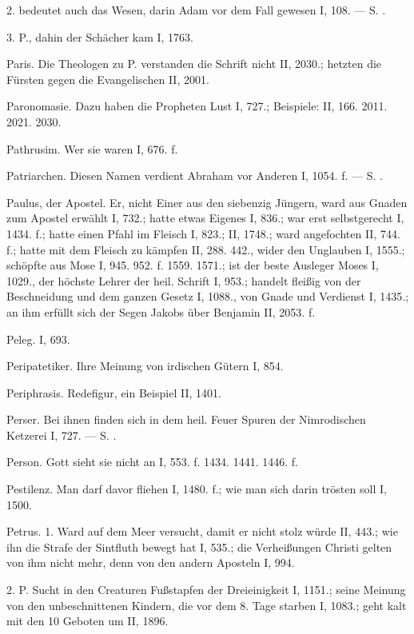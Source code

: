 2.  bedeutet auch das Wesen, darin Adam vor dem Fall gewesen I, 108. — S. .

3.  P., dahin der Schächer kam I, 1763.

Paris. Die Theologen zu P. verstanden die Schrift nicht II, 2030.; hetzten die Fürsten gegen die Evangelischen II, 2001.

Paronomasie. Dazu haben die Propheten Lust I, 727.; Beispiele: II, 166. 2011. 2021. 2030.

Pathrusim. Wer sie waren I, 676. f.

Patriarchen. Diesen Namen verdient Abraham vor Anderen I, 1054. f. — S. .

Paulus, der Apostel. Er, nicht Einer aus den siebenzig Jüngern, ward aus Gnaden zum Apostel erwählt I, 732.; hatte etwas Eigenes I, 836.; war erst selbstgerecht I, 1434. f.; hatte einen Pfahl im Fleisch I, 823.; II, 1748.; ward angefochten II, 744. f.; hatte mit dem Fleisch zu kämpfen II, 288. 442., wider den Unglauben I, 1555.; schöpfte aus Mose I, 945. 952. f. 1559. 1571.; ist der beste Ausleger Moses I, 1029., der höchste Lehrer der heil. Schrift I, 953.; handelt fleißig von der Beschneidung und dem ganzen Gesetz I, 1088., von Gnade und Verdienst I, 1435.; an ihm erfüllt sich der Segen Jakobs über Benjamin II, 2053. f.

Peleg. I, 693.

Peripatetiker. Ihre Meinung von irdischen Gütern I, 854.

Periphrasis. Redefigur, ein Beispiel II, 1401.

Perser. Bei ihnen finden sich in dem heil. Feuer Spuren der Nimrodischen Ketzerei I, 727. — S. .

Person. Gott sieht sie nicht an I, 553. f. 1434. 1441. 1446. f.

Pestilenz. Man darf davor fliehen I, 1480. f.; wie man sich darin trösten soll I, 1500.

Petrus. 1.  Ward auf dem Meer versucht, damit er nicht stolz würde II, 443.; wie ihn die Strafe der Sintfluth bewegt hat I, 535.; die Verheißungen Christi gelten von ihm nicht mehr, denn von den andern Aposteln I, 994.

2. P.  Sucht in den Creaturen Fußstapfen der Dreieinigkeit I, 1151.; seine Meinung von den unbeschnittenen Kindern, die vor dem 8. Tage starben I, 1083.; geht kalt mit den 10 Geboten um II, 1896.


